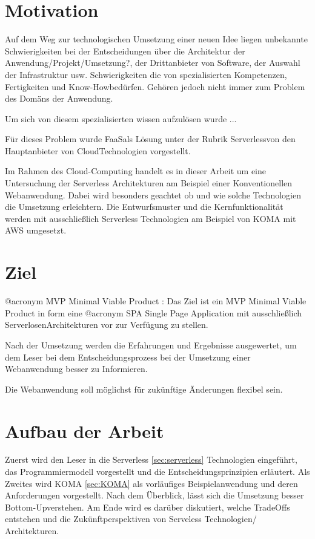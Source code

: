 \documentclass[
12pt,
english,
ngerman,
headsepline,
twoside,
openright,
numbers=noenddot,version=first
]{scrreprt}
\begin{document}
\section{Motivation}


Auf dem Weg zur technologischen Umsetzung einer neuen Idee liegen unbekannte Schwierigkeiten
bei der Entscheidungen über die Architektur der Anwendung/Projekt/Umsetzung?,
der Drittanbieter von Software, der Auswahl der Infrastruktur usw.
Schwierigkeiten die von spezialisierten Kompetenzen, Fertigkeiten und \glqq Know-How\grqq bedürfen.
Gehören jedoch nicht immer zum Problem des Domäns der Anwendung.

Um sich von diesem spezialisierten wissen aufzulösen wurde ...

Für dieses Problem wurde \glqq FaaS\grqq als Lösung unter der Rubrik \glqq Serverless\grqq von den Hauptanbieter von \glqq Cloud\grqq Technologien vorgestellt.

Im Rahmen des Cloud-Computing handelt es in dieser Arbeit um eine Untersuchung der Serverless Architekturen am Beispiel einer Konventionellen Webanwendung. Dabei wird besonders geachtet ob und wie solche Technologien die Umsetzung erleichtern. Die Entwurfsmuster und die Kernfunktionalität werden mit ausschließlich Serverless Technologien am Beispiel von KOMA mit AWS umgesetzt.


\section{Ziel}
\label{sec:task}

@acronym MVP Minimal Viable Product : \cite{rady2016serverless} Das Ziel ist ein MVP Minimal Viable Product in form eine @acronym SPA Single Page Application mit ausschließlich \glqq Serverlosen\grqq Architekturen vor zur Verfügung zu stellen.

Nach der Umsetzung werden die Erfahrungen und Ergebnisse ausgewertet, um dem Leser bei dem Entscheidungsprozess bei der Umsetzung einer Webanwendung besser zu Informieren.

Die Webanwendung soll möglichst für zukünftige Änderungen flexibel sein.

\section{Aufbau der Arbeit}
\label{sec:layout}

Zuerst wird den Leser in die Serverless \ref{sec:serverless} Technologien eingeführt, das Programmiermodell vorgestellt
und die Entscheidungsprinzipien erläutert.
Als Zweites wird KOMA \ref{sec:KOMA} als vorläufiges Beispielanwendung und deren Anforderungen vorgestellt.
Nach dem Überblick, lässt sich die Umsetzung besser \glqq Bottom-Up\grqq verstehen.
Am Ende wird es darüber diskutiert, welche TradeOffs entstehen und die Zukünftperspektiven von Serveless Technologien/ Architekturen.
\end{document}
